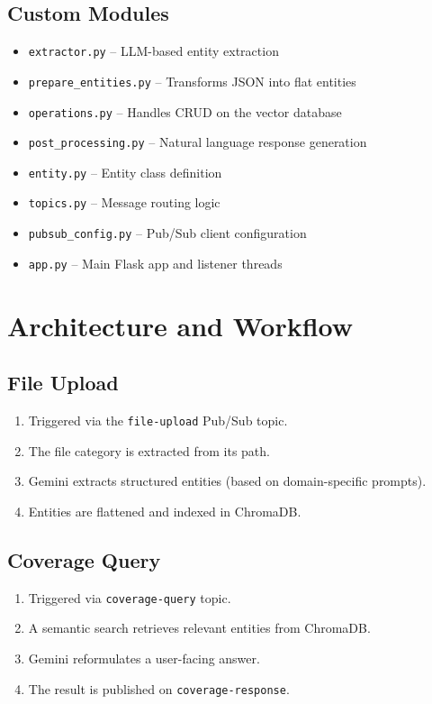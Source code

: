 \subsection{Custom Modules}
\begin{itemize}
    \item \texttt{extractor.py} -- LLM-based entity extraction
    \item \texttt{prepare\_entities.py} -- Transforms JSON into flat entities
    \item \texttt{operations.py} -- Handles CRUD on the vector database
    \item \texttt{post\_processing.py} -- Natural language response generation
    \item \texttt{entity.py} -- Entity class definition
    \item \texttt{topics.py} -- Message routing logic
    \item \texttt{pubsub\_config.py} -- Pub/Sub client configuration
    \item \texttt{app.py} -- Main Flask app and listener threads
\end{itemize}

\section{Architecture and Workflow}

\subsection{File Upload}
\begin{enumerate}
    \item Triggered via the \texttt{file-upload} Pub/Sub topic.
    \item The file category is extracted from its path.
    \item Gemini extracts structured entities (based on domain-specific prompts).
    \item Entities are flattened and indexed in ChromaDB.
\end{enumerate}

\subsection{Coverage Query}
\begin{enumerate}
    \item Triggered via \texttt{coverage-query} topic.
    \item A semantic search retrieves relevant entities from ChromaDB.
    \item Gemini reformulates a user-facing answer.
    \item The result is published on \texttt{coverage-response}.
\end{enumerate}


